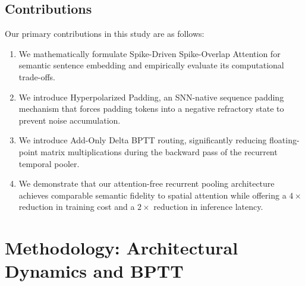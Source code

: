 \documentclass[10pt]{article} %
\begin{document}
\subsection*{Contributions}
Our primary contributions in this study are as follows:
\begin{enumerate}
    \item We mathematically formulate Spike-Driven Spike-Overlap Attention for semantic sentence embedding and empirically evaluate its computational trade-offs.
    \item We introduce Hyperpolarized Padding, an SNN-native sequence padding mechanism that forces padding tokens into a negative refractory state to prevent noise accumulation.
    \item We introduce Add-Only Delta BPTT routing, significantly reducing floating-point matrix multiplications during the backward pass of the recurrent temporal pooler.
    \item We demonstrate that our attention-free recurrent pooling architecture achieves comparable semantic fidelity to spatial attention while offering a $4\times$ reduction in training cost and a $2\times$ reduction in inference latency.
\end{enumerate}

\section{Methodology: Architectural Dynamics and BPTT}
\end{document}
